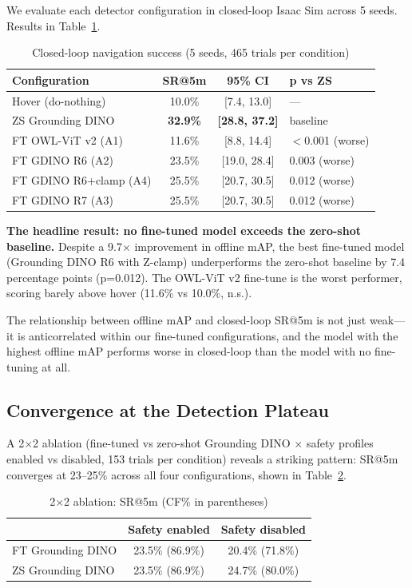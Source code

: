 \documentclass[conference]{IEEEtran}
\begin{document}
We evaluate each detector configuration in closed-loop Isaac Sim across 5 seeds. Results in Table~\ref{tab:closedloop}.

\begin{table}[t]
\centering
\caption{Closed-loop navigation success (5 seeds, 465 trials per condition)}
\label{tab:closedloop}
\begin{tabular}{lccl}
\toprule
Configuration & SR@5m & 95\% CI & p vs ZS \\
\midrule
Hover (do-nothing) & 10.0\% & [7.4, 13.0] & --- \\
ZS Grounding DINO & \textbf{32.9\%} & \textbf{[28.8, 37.2]} & baseline \\
FT OWL-ViT v2 (A1) & 11.6\% & [8.8, 14.4] & $<$0.001 (worse) \\
FT GDINO R6 (A2) & 23.5\% & [19.0, 28.4] & 0.003 (worse) \\
FT GDINO R6+clamp (A4) & 25.5\% & [20.7, 30.5] & 0.012 (worse) \\
FT GDINO R7 (A3) & 25.5\% & [20.7, 30.5] & 0.012 (worse) \\
\bottomrule
\end{tabular}
\end{table}

\textbf{The headline result: no fine-tuned model exceeds the zero-shot baseline.} Despite a 9.7$\times$ improvement in offline mAP, the best fine-tuned model (Grounding DINO R6 with Z-clamp) underperforms the zero-shot baseline by 7.4 percentage points (p=0.012). The OWL-ViT v2 fine-tune is the worst performer, scoring barely above hover (11.6\% vs 10.0\%, n.s.).

The relationship between offline mAP and closed-loop SR@5m is not just weak---it is anticorrelated within our fine-tuned configurations, and the model with the highest offline mAP performs worse in closed-loop than the model with no fine-tuning at all.

\subsection{Convergence at the Detection Plateau}

A 2$\times$2 ablation (fine-tuned vs zero-shot Grounding DINO $\times$ safety profiles enabled vs disabled, 153 trials per condition) reveals a striking pattern: SR@5m converges at 23--25\% across all four configurations, shown in Table~\ref{tab:ablation}.

\begin{table}[t]
\centering
\caption{2$\times$2 ablation: SR@5m (CF\% in parentheses)}
\label{tab:ablation}
\begin{tabular}{lcc}
\toprule
& Safety enabled & Safety disabled \\
\midrule
FT Grounding DINO & 23.5\% (86.9\%) & 20.4\% (71.8\%) \\
ZS Grounding DINO & 23.5\% (86.9\%) & 24.7\% (80.0\%) \\
\bottomrule
\end{tabular}
\end{table}
\end{document}
